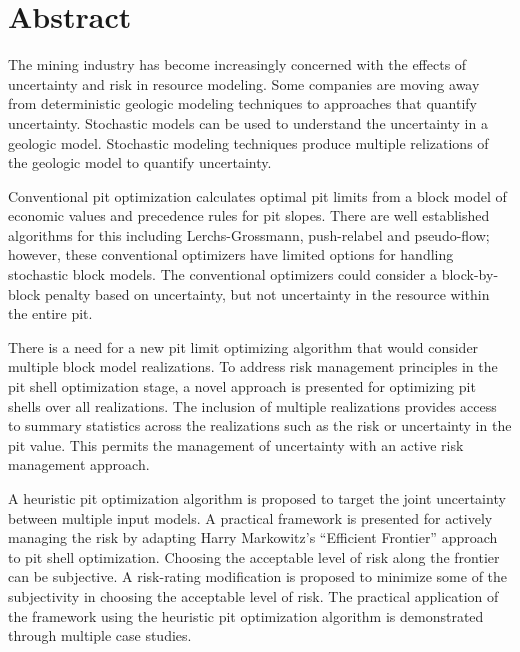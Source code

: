 
\chapter*{Abstract}
\begin{DoubleSpace}
The mining industry has become increasingly concerned with the effects of uncertainty and risk in resource modeling. Some companies are moving away from deterministic geologic modeling techniques to approaches that quantify uncertainty. Stochastic models can be used to understand the uncertainty in a geologic model. Stochastic modeling techniques produce multiple relizations of the geologic model to quantify uncertainty.

Conventional pit optimization calculates optimal pit limits from a block model of economic values and precedence rules for pit slopes. There are well established algorithms for this including Lerchs-Grossmann, push-relabel and pseudo-flow; however, these conventional optimizers have limited options for handling stochastic block models. The conventional optimizers could consider a block-by-block penalty based on uncertainty, but not uncertainty in the resource within the entire pit.

There is a need for a new pit limit optimizing algorithm that would consider multiple block model realizations. To address risk management principles in the pit shell optimization stage, a novel approach is presented for optimizing pit shells over all realizations. The inclusion of multiple realizations provides access to summary statistics across the realizations such as the risk or uncertainty in the pit value. This permits the management of uncertainty with an active risk management approach.

A heuristic pit optimization algorithm is proposed to target the joint uncertainty between multiple input models. A practical framework is presented for actively managing the risk by adapting Harry Markowitz's ``Efficient Frontier'' approach to pit shell optimization. Choosing the acceptable level of risk along the frontier can be subjective. A risk-rating modification is proposed to minimize some of the subjectivity in choosing the acceptable level of risk. The practical application of the framework using the heuristic pit optimization algorithm is demonstrated through multiple case studies.

\end{DoubleSpace}
